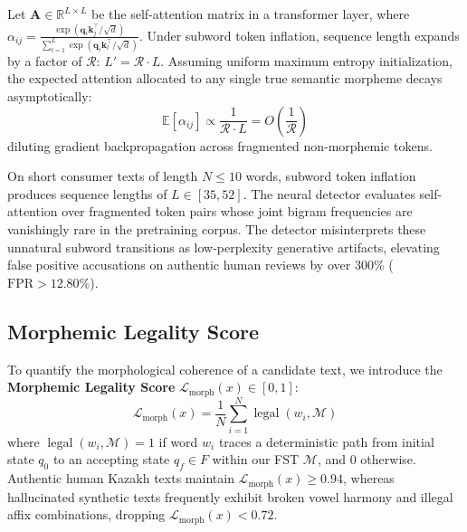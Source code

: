 \begin{theorem}
Let $\mathbf{A} \in \mathbb{R}^{L \times L}$ be the self-attention matrix in a transformer layer, where $\alpha_{ij} = \frac{\exp(\mathbf{q}_i \mathbf{k}_j^\top / \sqrt{d})}{\sum_{l=1}^L \exp(\mathbf{q}_i \mathbf{k}_l^\top / \sqrt{d})}$. Under subword token inflation, sequence length expands by a factor of $\mathcal{R}$: $L' = \mathcal{R} \cdot L$. Assuming uniform maximum entropy initialization, the expected attention allocated to any single true semantic morpheme decays asymptotically:
\begin{equation}
\mathbb{E}[\alpha_{ij}] \propto \frac{1}{\mathcal{R} \cdot L} = O\left(\frac{1}{\mathcal{R}}\right)
\end{equation}
diluting gradient backpropagation across fragmented non-morphemic tokens.
\end{theorem}

\begin{proposition}
On short consumer texts of length $N \le 10$ words, subword token inflation produces sequence lengths of $L \in [35, 52]$. The neural detector evaluates self-attention over fragmented token pairs whose joint bigram frequencies are vanishingly rare in the pretraining corpus. The detector misinterprets these unnatural subword transitions as low-perplexity generative artifacts, elevating false positive accusations on authentic human reviews by over 300\% ($\mathrm{FPR} > 12.80\%$).
\end{proposition}

\subsection{Morphemic Legality Score}
To quantify the morphological coherence of a candidate text, we introduce the \textbf{Morphemic Legality Score} $\mathcal{L}_{\text{morph}}(x) \in [0, 1]$:
\begin{equation}
\label{eq:ling_legality_score}
\mathcal{L}_{\text{morph}}(x) = \frac{1}{N} \sum_{i=1}^N \operatorname{legal}(w_i, \mathcal{M})
\end{equation}
where $\operatorname{legal}(w_i, \mathcal{M}) = 1$ if word $w_i$ traces a deterministic path from initial state $q_0$ to an accepting state $q_f \in F$ within our FST $\mathcal{M}$, and $0$ otherwise. Authentic human Kazakh texts maintain $\mathcal{L}_{\text{morph}}(x) \ge 0.94$, whereas hallucinated synthetic texts frequently exhibit broken vowel harmony and illegal affix combinations, dropping $\mathcal{L}_{\text{morph}}(x) < 0.72$.

